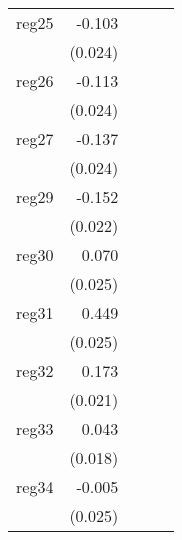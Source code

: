 {\begin{longtable}{l*{4}{D{.}{.}{-1}}}
\addlinespace
reg25       &      -0.103\sym{***}&                     &                     &                     \\
            &     (0.024)         &                     &                     &                     \\
\addlinespace
reg26       &      -0.113\sym{***}&                     &                     &                     \\
            &     (0.024)         &                     &                     &                     \\
\addlinespace
reg27       &      -0.137\sym{***}&                     &                     &                     \\
            &     (0.024)         &                     &                     &                     \\
\addlinespace
reg29       &      -0.152\sym{***}&                     &                     &                     \\
            &     (0.022)         &                     &                     &                     \\
\addlinespace
reg30       &       0.070\sym{**} &                     &                     &                     \\
            &     (0.025)         &                     &                     &                     \\
\addlinespace
reg31       &       0.449\sym{***}&                     &                     &                     \\
            &     (0.025)         &                     &                     &                     \\
\addlinespace
reg32       &       0.173\sym{***}&                     &                     &                     \\
            &     (0.021)         &                     &                     &                     \\
\addlinespace
reg33       &       0.043\sym{*}  &                     &                     &                     \\
            &     (0.018)         &                     &                     &                     \\
\addlinespace
reg34       &      -0.005         &                     &                     &                     \\
            &     (0.025)         &                     &                     &                     \\

\end{longtable}}
